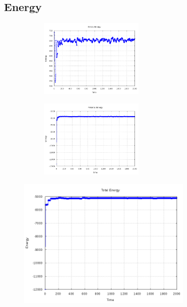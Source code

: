 \documentclass[letterpaper,12pt]{article}
\numberwithin{equation}{subsection}
\begin{document}
\subsection{Energy}
\begin{figure}[h!]
        \centering
        \begin{subfigure}[b]{0.4\textwidth}
                \centering
                \includegraphics[width=5cm]{ener_kin.png}
        \end{subfigure}
        \quad
        \begin{subfigure}[b]{0.4\textwidth}
                \centering
                \includegraphics[width=5cm]{ener_pot.png}
        \end{subfigure}
	\end{figure}
\begin{figure}[H]
                \centering
                \includegraphics[width=0.75\textwidth]{ener_tot.png}
\end{figure}
\end{document}
